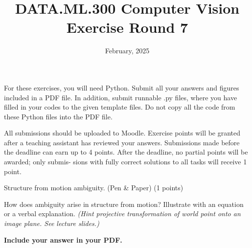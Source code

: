 \documentclass[12pt]{article} %
\title{DATA.ML.300 Computer Vision\\ Exercise Round 7}
\date{\vspace{-5mm} February, 2025}
\date{} %
\newenvironment{exercise}[2][Task]{\begin{trivlist}
\item[\hskip \labelsep {\bfseries #1}\hskip \labelsep {\bfseries #2.}]}{\end{trivlist}}
\begin{document}
\maketitle


\noindent For these exercises, you will need Python. Submit all your answers and figures included in
a PDF file. In addition, submit runnable .py files, where you have filled in your codes to
the given template files. Do not copy all the code from these Python files into the PDF file.
\newline

\noindent All submissions should be uploaded to Moodle. Exercise points will be granted after a
teaching assistant has reviewed your answers. Submissions made before the deadline can
earn up to 4 points. After the deadline, no partial points will be awarded; only submis-
sions with fully correct solutions to all tasks will receive 1 point.
\newline


\begin{exercise}{1} Structure from motion ambiguity. (Pen \& Paper) (1 points)
\vspace{1mm}

  \noindent How does ambiguity arise in structure from motion?
  Illustrate with an equation or a verbal explanation.
  \textit{(Hint projective transformation of world point onto an image plane. See lecture slides.)}

  \noindent \textbf{Include your answer in your PDF.}

\end{exercise}
\end{document}
